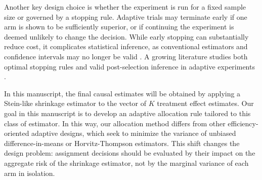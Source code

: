 \documentclass{article}
\begin{document}
Another key design choice is whether the experiment is run for a fixed sample size or governed by a stopping rule. Adaptive trials may terminate early if one arm is shown to be sufficiently superior, or if continuing the experiment is deemed unlikely to change the decision. While early stopping can substantially reduce cost, it complicates statistical inference, as conventional estimators and confidence intervals may no longer be valid \citep{Johari2017}. A growing literature studies both optimal stopping rules and valid post-selection inference in adaptive experiments \citep{Ham2023}.

In this manuscript, the final causal estimates will be obtained by applying a Stein-like shrinkage estimator to the vector of $K$ treatment effect estimates. Our goal in this manuscript is to develop an adaptive allocation rule tailored to this class of estimator. In this way, our allocation method differs from other efficiency-oriented adaptive designs, which seek to minimize the variance of unbiased difference-in-means or Horvitz-Thompson estimators. This shift changes the design problem: assignment decisions should be evaluated by their impact on the aggregate risk of the shrinkage estimator, not by the marginal variance of each arm in isolation. 


\end{document}
